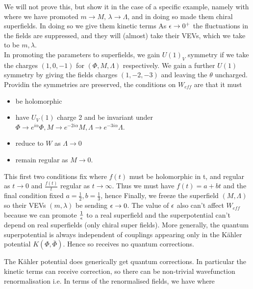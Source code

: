 \documentclass{article}
\begin{document}
\begin{example}
We will not prove this, but show it in the case of a specific example, namely with 
where we have promoted $m \to M, \, \lambda \to \Lambda$, and in doing so made them chiral superfields. In doing so we give them kinetic terms
As $\epsilon \to 0^+$ the fluctuations in the fields are suppressed, and they will (almost) take their VEVs, which we take to be $m,\lambda$. \\
In promoting the parameters to superfields, we gain $U(1)_V$ symmetry if we take the charges $(1,0,-1)$ for $(\Phi,M,\Lambda)$ respectively. We gain a further $U(1)$ symmetry by giving the fields charges $(1,-2,-3)$ and leaving the $\theta$ uncharged. \\
Providin the symmetries are preserved, the conditions on $W_{eff}$ are that it must  
\begin{itemize}
    \item be holomorphic 
    \item have $U_V(1)$ charge 2 and be invariant under $\Phi \to e^{i\alpha}\Phi, M \to e^{-2i\alpha}M, \Lambda \to e^{-3i\alpha}\Lambda$.
    \item reduce to $W$ as $\Lambda \to 0$
    \item remain regular as $M \to 0$. 
\end{itemize}
This first two conditions fix 
where $f(t)$ must be holomorphic in t, and regular as $t \to 0$ and $\frac{f(t)}{t}$ regular as $t \to \infty$. Thus we must have $f(t) = a+bt$ and the final condition fixed $a=\frac{1}{2}, b = \frac{1}{3}$, hence 
Finally, we freeze the superfield $(M,\Lambda)$ so their VEVs $(m,\lambda)$ be sending $\epsilon \to 0$.
The value of $\epsilon$ also can't affect $W_{eff}$ because we can promote $\frac{1}{\epsilon}$ to a real superfield and the superpotential can't depend on real superfields (only chiral super fields). More generally, the quantum superpotential is always independent of couplings appearing only in the K\"ahler potential $K(\Phi,\bar{\Phi})$. Hence 
so receives no quantum corrections. 
\end{example}

\begin{remark}
The K\"ahler potential does generically get quantum corrections. In particular the kinetic terms can receive correction, so there can be non-trivial wavefunction renormalisation 
i.e. 
In terms of the renormalised fields, we have
where 
\end{remark}
\end{document}
